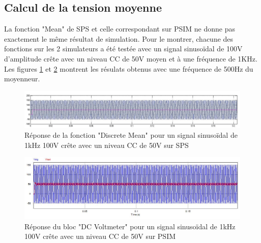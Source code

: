 \documentclass[11pt,letterpaper,final]{report}
\begin{document}
\subsection{Calcul de la tension moyenne}

La fonction "Mean" de SPS et celle correspondant sur PSIM ne donne pas exactement le même résultat de simulation. Pour le montrer, chacune des fonctions sur les 2 simulateurs a été testée avec un signal sinusoïdal de  100V d'amplitude crête avec un niveau CC de 50V moyen et à une fréquence de 1KHz. Les figures \ref{dis_mean} et \ref{D_mean} montrent les résulats obtenus avec une fréquence de 500Hz du moyenneur.



\begin{figure}[h]
\centering
\includegraphics[scale=0.5]{fig/moy_sim.jpg}
\caption{Réponse de la fonction "Discrete Mean" pour un signal sinusoïdal de 1kHz 100V crête avec un niveau CC de 50V sur SPS}
\label{dis_mean}
\end{figure}

\begin{figure}[h]
\centering
\includegraphics[scale=0.5]{fig/moy_PSIM.jpg}
\caption{Réponse du bloc "DC Voltmeter" pour un signal sinusoïdal de 1kHz 100V crête avec un niveau CC de 50V sur PSIM}
\label{D_mean}
\end{figure}
\end{document}
